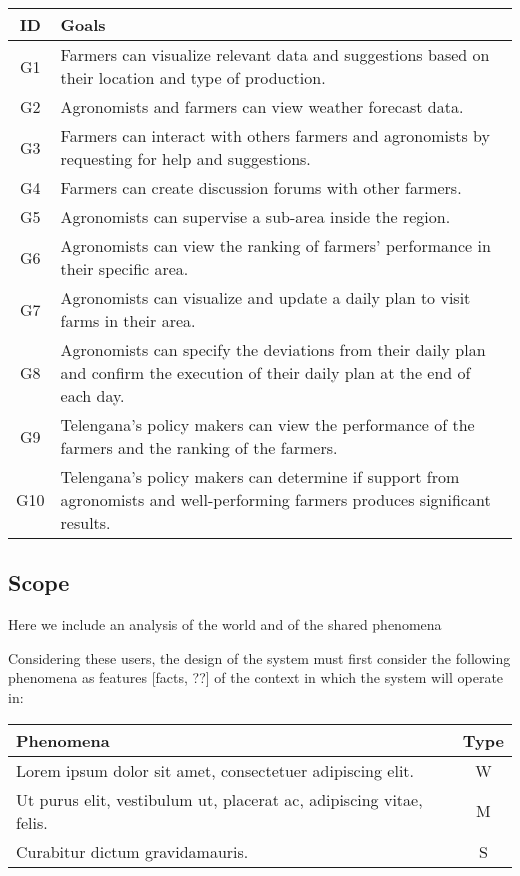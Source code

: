 \begin{center}
\renewcommand{\arraystretch}{1.5}
\begin{tabular}{|c| >{\raggedright\arraybackslash}p{12cm}|} \hline

    \textbf{ID} & \textbf{Goals}\\\hline
    G1  & Farmers can visualize relevant data and suggestions based on their location and type of production.\\
    G2  & Agronomists and farmers can view weather forecast data.\\
    G3  & Farmers can interact with others farmers and agronomists by requesting for help and suggestions.\\
    G4  & Farmers can create discussion forums with other farmers.\\
    G5  & Agronomists can supervise a sub-area inside the region. \\
    G6  & Agronomists can view the ranking of farmers’ performance in their specific area.\\
    G7  & Agronomists can visualize and update a daily plan to visit farms in their area.\\
    G8  & Agronomists can specify the deviations from their daily plan and confirm the execution of their daily plan at the end of each day.\\
    G9  & Telengana’s policy makers can view the performance of the farmers and the ranking of the farmers.\\
    G10 & Telengana’s policy makers can determine if support from agronomists and well-performing farmers produces significant results.\\\hline
\end{tabular}
\end{center}

\subsection{Scope}
Here we include an analysis of the world and of the shared phenomena 

Considering these users, the design of the system must first consider the following phenomena as features [facts, ??] of the context in which the system will operate in:


\begin{center}
\renewcommand{\arraystretch}{1.5}
\begin{tabular}{|>{\raggedright\arraybackslash}m{12cm}|c|} \hline
    \textbf{Phenomena} & \textbf{Type}\\ \hline %
    Lorem ipsum dolor sit amet, consectetuer adipiscing elit. & W \\%
    Ut purus elit, vestibulum ut, placerat ac, adipiscing vitae, felis. & M\\ %
    Curabitur dictum gravidamauris. & S\\
    \hline
\end{tabular}
\end{center}


